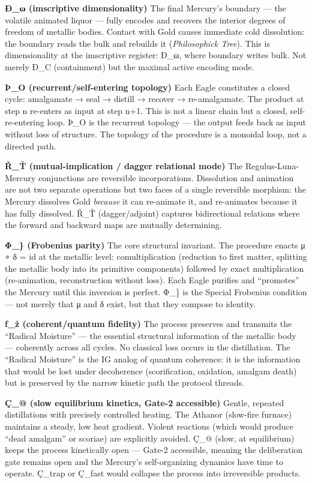 \textbf{Ð\_ω (imscriptive dimensionality)} The final Mercury's boundary
--- the volatile animated liquor --- fully encodes and recovers the
interior degrees of freedom of metallic bodies. Contact with Gold causes
immediate cold dissolution: the boundary reads the bulk and rebuilds it
(\emph{Philosophick Tree}). This is dimensionality at the imscriptive
register: Ð\_ω, where boundary writes bulk. Not merely Ð\_C
(containment) but the maximal active encoding mode.

\textbf{Þ\_O (recurrent/self-entering topology)} Each Eagle constitutes
a closed cycle: amalgamate → seal → distill → recover → re-amalgamate.
The product at step n re-enters as input at step n+1. This is not a
linear chain but a closed, self-re-entering loop. Þ\_O is the recurrent
topology --- the output feeds back as input without loss of structure.
The topology of the procedure is a monoidal loop, not a directed path.

\textbf{Ř\_Ť (mutual-implication / dagger relational mode)} The
Regulus-Luna-Mercury conjunctions are reversible incorporations.
Dissolution and animation are not two separate operations but two faces
of a single reversible morphism: the Mercury dissolves Gold
\emph{because} it can re-animate it, and re-animates because it has
fully dissolved. Ř\_Ť (dagger/adjoint) captures bidirectional relations
where the forward and backward maps are mutually determining.

\textbf{Φ\_\} (Frobenius parity)} The core structural invariant. The
procedure enacts μ ∘ δ = id at the metallic level: comultiplication
(reduction to first matter, splitting the metallic body into its
primitive components) followed by exact multiplication (re-animation,
reconstruction without loss). Each Eagle purifies and ``promotes'' the
Mercury until this inversion is perfect. Φ\_\} is the Special Frobenius
condition --- not merely that μ and δ exist, but that they compose to
identity.

\textbf{ƒ\_ż (coherent/quantum fidelity)} The process preserves and
transmits the ``Radical Moisture'' --- the essential structural
information of the metallic body --- coherently across all cycles. No
classical loss occurs in the distillation. The ``Radical Moisture'' is
the IG analog of quantum coherence: it is the information that would be
lost under decoherence (scorification, oxidation, amalgam death) but is
preserved by the narrow kinetic path the protocol threads.

\textbf{Ç\_@ (slow equilibrium kinetics, Gate-2 accessible)} Gentle,
repeated distillations with precisely controlled heating. The Athanor
(slow-fire furnace) maintains a steady, low heat gradient. Violent
reactions (which would produce ``dead amalgam'' or scoriae) are
explicitly avoided. Ç\_@ (slow, at equilibrium) keeps the process
kinetically open --- Gate-2 accessible, meaning the deliberation gate
remains open and the Mercury's self-organizing dynamics have time to
operate. Ç\_trap or Ç\_fast would collapse the process into irreversible
products.

